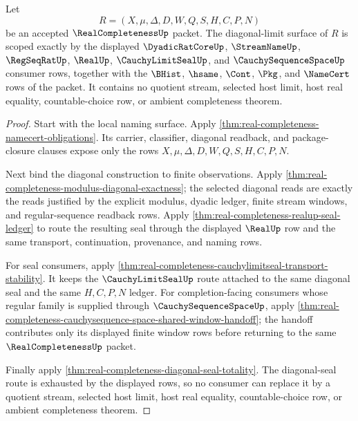 \begin{theorem}
\label{thm:real-completeness-scoped-closure}
Let
$$
R=(X,\mu,\Delta,D,W,Q,S,H,C,P,N)
$$
be an accepted $\RealCompletenessUp$ packet. The diagonal-limit surface of $R$ is scoped exactly by the displayed $\DyadicRatCoreUp$, $\StreamNameUp$, $\RegSeqRatUp$, $\RealUp$, $\CauchyLimitSealUp$, and $\CauchySequenceSpaceUp$ consumer rows, together with the $\BHist$, $\hsame$, $\Cont$, $\Pkg$, and $\NameCert$ rows of the packet. It contains no quotient stream, selected host limit, host real equality, countable-choice row, or ambient completeness theorem.
\end{theorem}
\begin{proof}
Start with the local naming surface. Apply \autoref{thm:real-completeness-namecert-obligations}. Its carrier, classifier, diagonal readback, and package-closure clauses expose only the rows $X,\mu,\Delta,D,W,Q,S,H,C,P,N$.

Next bind the diagonal construction to finite observations. Apply \autoref{thm:real-completeness-modulus-diagonal-exactness}; the selected diagonal reads are exactly the reads justified by the explicit modulus, dyadic ledger, finite stream windows, and regular-sequence readback rows. Apply \autoref{thm:real-completeness-realup-seal-ledger} to route the resulting seal through the displayed $\RealUp$ row and the same transport, continuation, provenance, and naming rows.

For seal consumers, apply \autoref{thm:real-completeness-cauchylimitseal-transport-stability}. It keeps the $\CauchyLimitSealUp$ route attached to the same diagonal seal and the same $H,C,P,N$ ledger. For completion-facing consumers whose regular family is supplied through $\CauchySequenceSpaceUp$, apply \autoref{thm:real-completeness-cauchysequence-space-shared-window-handoff}; the handoff contributes only its displayed finite window rows before returning to the same $\RealCompletenessUp$ packet.

Finally apply \autoref{thm:real-completeness-diagonal-seal-totality}. The diagonal-seal route is exhausted by the displayed rows, so no consumer can replace it by a quotient stream, selected host limit, host real equality, countable-choice row, or ambient completeness theorem.
\end{proof}

